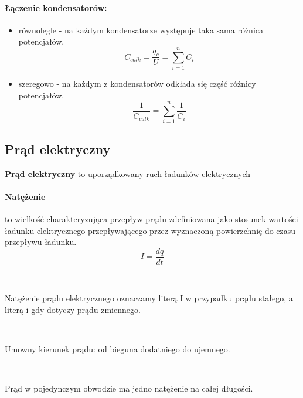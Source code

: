 \documentclass{article}
\begin{document}
            \paragraph{Łączenie kondensatorów:}
            \begin{itemize}
                \item równolegle - na każdym kondensatorze występuje
                taka sama różnica potencjałów.
                \begin{equation}
                    C_{calk} = \frac{q_c}{U} = \sum\limits_{i = 1}^n C_i
                \end{equation}

                \item szeregowo - na każdym z kondensatorów odkłada
                się część różnicy potencjałów.
                \begin{equation}
                    \frac{1}{C_{calk}} =  \sum\limits_{i = 1}^n \frac{1}{C_i}
                \end{equation}
            \end{itemize}

        \subsection{Prąd elektryczny}
            \textbf{Prąd elektryczny} to uporządkowany ruch ładunków elektrycznych
            \paragraph{Natężenie} to wielkość charakteryzująca przepływ prądu
            zdefiniowana jako stosunek wartości ładunku elektrycznego
            przepływającego przez wyznaczoną powierzchnię do czasu
            przepływu ładunku.
            \begin{equation}
                I = \frac{dq}{dt}
            \end{equation}

            \

            Natężenie prądu elektrycznego oznaczamy literą I w przypadku
            prądu stałego, a literą i gdy dotyczy prądu zmiennego.

            \

            Umowny kierunek prądu: od bieguna dodatniego do ujemnego.

            \

            Prąd w pojedynczym obwodzie ma jedno natężenie na całej długości.
\end{document}
